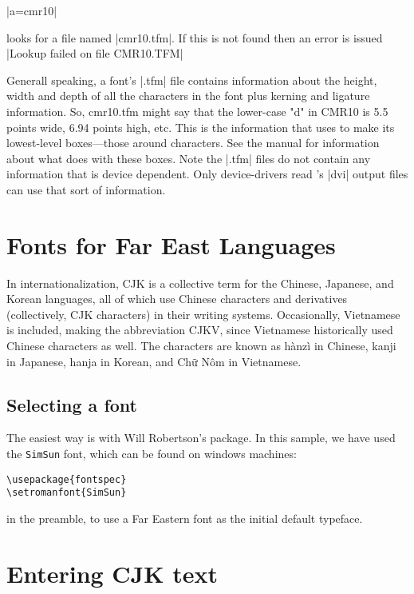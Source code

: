 |\font a=cmr10|

\noindent \tex looks for  a file named |cmr10.tfm|. If this is not found then an error is issued |Lookup failed on file CMR10.TFM|

Generall speaking, a font's |.tfm| file contains information about the height, width and depth of all the characters in the font plus kerning and ligature information. So, cmr10.tfm might say that the lower-case "d" in CMR10 is 5.5 points wide, 6.94 points high, etc. This is the information that \tex uses to make its lowest-level boxes---those around characters. See the \tex manual for information about what \tex does with these boxes. Note the |.tfm| files do not contain any information that is device dependent. Only device-drivers read \tex's |dvi| output files can use that sort of information.


\section{Fonts for Far East Languages}

In internationalization, CJK is a collective term for the Chinese, Japanese, and Korean languages, all of which use Chinese characters and derivatives (collectively, CJK characters) in their writing systems. Occasionally, Vietnamese is included, making the abbreviation CJKV, since Vietnamese historically used Chinese characters as well.
The characters are known as hànzì in Chinese, kanji in Japanese, hanja in Korean, and Chữ Nôm in Vietnamese.


\subsection{Selecting a font}

The easiest way is with Will Robertson's  package. In this sample, we have used the \texttt{SimSun} font, which can be found on windows machines:

\begin{verbatim}
\usepackage{fontspec}
\setromanfont{SimSun}
\end{verbatim}
in the preamble, to use a Far Eastern font as the initial default typeface.

\section{Entering CJK text}

